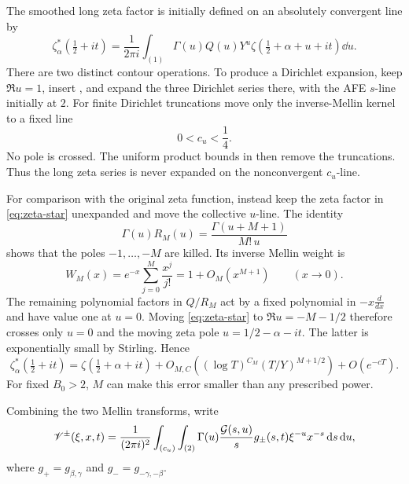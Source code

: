 The smoothed long zeta factor is initially defined on an absolutely
convergent line by
\begin{equation}\label{eq:zeta-star}
 \zeta_\alpha^*\!\left(\tfrac12+it\right)
 =\frac{1}{2\pi i}\int_{(1)}\Gamma(u)Q(u)Y^u
 \zeta\!\left(\tfrac12+\alpha+u+it\right)\dd u.
\end{equation}
There are two distinct contour operations.  To produce a Dirichlet
expansion, keep $\Re u=1$, insert , and expand the three
Dirichlet series there, with the AFE $s$-line initially at $2$.  For finite
Dirichlet truncations move only the inverse-Mellin kernel to a fixed line
\begin{equation}\label{eq:cu-range}
                           0<c_u<\frac14.
\end{equation}
No pole is crossed.  The uniform product bounds in 
then remove the truncations.  Thus the long zeta series is never expanded on
the nonconvergent $c_u$-line.

For comparison with the original zeta function, instead keep the zeta factor
in \eqref{eq:zeta-star} unexpanded and move the collective $u$-line.  The
identity
\begin{equation}\label{eq:gamma-RM}
                  \Gamma(u)R_M(u)=\frac{\Gamma(u+M+1)}{M!\,u}
\end{equation}
shows that the poles $-1,\ldots,-M$ are killed.  Its inverse Mellin weight is
\begin{equation}\label{eq:WM}
 W_M(x)=e^{-x}\sum_{j=0}^{M}\frac{x^j}{j!}
       =1+O_M(x^{M+1})\qquad(x\longrightarrow0).
\end{equation}
The remaining polynomial factors in $Q/R_M$ act by a fixed polynomial in
$-x\frac{d}{dx}$ and have value one at $u=0$.  Moving
\eqref{eq:zeta-star} to $\Re u=-M-1/2$ therefore crosses only $u=0$ and the
moving zeta pole $u=1/2-\alpha-it$.  The latter is exponentially small by
Stirling.  Hence
\begin{equation}\label{eq:zeta-star-recovery}
 \zeta_\alpha^*\!\left(\tfrac12+it\right)
 =\zeta\!\left(\tfrac12+\alpha+it\right)
 +O_{M,C}\!\left((\log T)^{C_M}(T/Y)^{M+1/2}\right)+O(e^{-cT}).
\end{equation}
For fixed $B_0>2$, $M$ can make this error smaller than any prescribed power.

Combining the two Mellin transforms, write
\begin{equation}\label{eq:coupled-weight}
 \mathscr V^\pm(\xi,x,t)=\frac{1}{(2\pi i)^2}
 \int_{(c_u)}\int_{(2)}\Gamma(u)\frac{\mathcal G(s,u)}s
 g_\pm(s,t)\xi^{-u}x^{-s}\,\mathrm d s\,\mathrm d u,
\end{equation}
where $g_+=g_{\beta,\gamma}$ and $g_-=g_{-\gamma,-\beta}$.

